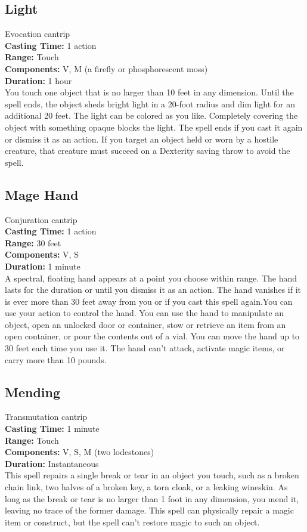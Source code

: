 \documentclass[11pt, A4paper, english]{article}
\begin{document}
		\subsection{Light}
Evocation cantrip \\
\textbf{Casting Time:} 1 action \\
\textbf{Range:} Touch \\
\textbf{Components:} V, M (a firefly or phosphorescent moss) \\
\textbf{Duration:} 1 hour \\
You touch one object that is no larger than 10 feet in any dimension. Until the spell ends, the object sheds bright light in a 20-foot radius and dim light for an additional 20 feet. The light can be colored as you like. Completely covering the object with something opaque blocks the light. The spell ends if you cast it again or dismiss it as an action. If you target an object held or worn by a hostile creature, that creature must succeed on a Dexterity saving throw to avoid the spell.

		\subsection{Mage Hand}
Conjuration cantrip \\
\textbf{Casting Time:} 1 action \\
\textbf{Range:} 30 feet \\
\textbf{Components:} V, S \\
\textbf{Duration:} 1 minute \\
A spectral, floating hand appears at a point you choose within range. The hand lasts for the duration or until you dismiss it as an action. The hand vanishes if it is ever more than 30 feet away from you or if you cast this spell again.You can use your action to control the hand. You can use the hand to manipulate an object, open an unlocked door or container, stow or retrieve an item from an open container, or pour the contents out of a vial. You can move the hand up to 30 feet each time you use it. The hand can’t attack, activate magic items, or carry more than 10 pounds.

		\subsection{Mending}
Transmutation cantrip \\
\textbf{Casting Time:} 1 minute \\
\textbf{Range:} Touch \\
\textbf{Components:} V, S, M (two lodestones) \\
\textbf{Duration:} Instantaneous \\
This spell repairs a single break or tear in an object you touch, such as a broken chain link, two halves of a broken key, a torn cloak, or a leaking wineskin. As long as the break or tear is no larger than 1 foot in any dimension, you mend it, leaving no trace of the former damage. This spell can physically repair a magic item or construct, but the spell can’t restore magic to such an object.
\end{document}
